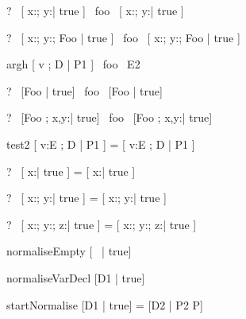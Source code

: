 \begin{zed}
  \vdash?~ [ x:\nat; y:\nat | true ] ~foo~ [ x:\nat; y:\nat | true ]
\end{zed}

\begin{zed}
  \vdash?~ [ x:\nat; y:\nat ; Foo | true ] ~foo~
           [ x:\nat; y:\nat ; Foo | true ]
\end{zed}


\begin{zedrule}{argh}
  [ v ; D | P1 ] ~foo~ E2
\end{zedrule}

\begin{zed}
  \vdash?~ [Foo | true] ~foo~ [Foo | true]
\end{zed}

\begin{zed}
  \vdash?~ [Foo ; x,y:\nat | true] ~foo~ [Foo ; x,y:\nat | true]
\end{zed}

\begin{zedrule}{test2}
  [ v:E ; D | P1 ] = [ v:E ; D | P1 ]
\end{zedrule}

\begin{zed}
  \vdash?~ [ x:\nat | true ] = [ x:\nat | true ]
\end{zed}

\begin{zed}
  \vdash?~ [ x:\nat; y:\nat | true ] = [ x:\nat; y:\nat | true ]
\end{zed}

\begin{zed}
  \vdash?~ [ x:\nat; y:\nat ; z:\nat | true ] =
           [ x:\nat; y:\nat ; z:\nat | true ]
\end{zed}



\begin{zedrule}{normaliseEmpty}
   [~ | true] \unfoldsTo [~ | true]
\end{zedrule}

\begin{zedrule}{normaliseVarDecl}
   [D1 | true] \unfoldsTo [D2 | P2]
\derives
   [v:E; D1 | true] \unfoldsTo [v:E; D2 | P2]
\end{zedrule}

\begin{zedrule}{startNormalise}
   [D1 | true] \unfoldsTo [D2 | P2]
\derives
   [D1 | P] = [D2 | P2 \land P]
\end{zedrule}

